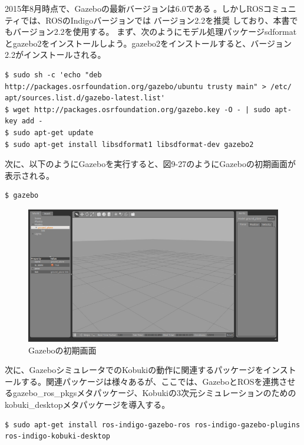 \begin{itemize}
2015年8月時点で、Gazeboの最新バージョンは6.0である  。しかしROSコミュニティでは、ROSのIndigoバージョンでは  バージョン2.2を推奨  しており、本書でもバージョン2.2を使用する。
まず、次のようにモデル処理パッケージsdformatとgazebo2をインストールしよう。gazebo2をインストールすると、バージョン2.2がインストールされる。

\begin{lstlisting}[language=ROS]
$ sudo sh -c 'echo "deb http://packages.osrfoundation.org/gazebo/ubuntu trusty main" > /etc/ apt/sources.list.d/gazebo-latest.list'
$ wget http://packages.osrfoundation.org/gazebo.key -O - | sudo apt-key add -
$ sudo apt-get update
$ sudo apt-get install libsdformat1 libsdformat-dev gazebo2
\end{lstlisting}

次に、以下のようにGazeboを実行すると、図9-27のようにGazeboの初期画面が表示される。

\begin{lstlisting}[language=ROS]
$ gazebo
\end{lstlisting}

\begin{figure}[htp]
  \centering
  \includegraphics[width=\columnwidth]{pictures/chapter9/pic_09_27.png}
  \caption{Gazeboの初期画面}
\end{figure}

次に、GazeboシミュレータでのKobukiの動作に関連するパッケージをインストールする。関連パッケージは様々あるが、ここでは、GazeboとROSを連携させるgazebo\_ros\_pkgsメタパッケージ、Kobukiの3次元シミュレーションのためのkobuki\_desktopメタパッケージを導入する。

\begin{lstlisting}[language=ROS]
$ sudo apt-get install ros-indigo-gazebo-ros ros-indigo-gazebo-plugins ros-indigo-kobuki-desktop
\end{lstlisting}


\end{itemize}
